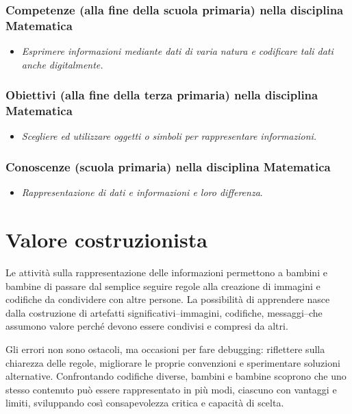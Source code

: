 \subsubsection{Competenze (alla fine della scuola primaria) nella disciplina Matematica}


\begin{itemize}
\item
  \emph{Esprimere informazioni mediante dati di varia natura e codificare tali dati anche digitalmente.}
\end{itemize}


\subsubsection{Obiettivi (alla fine della terza primaria) nella disciplina Matematica}


\begin{itemize}
\item
  \emph{Scegliere ed utilizzare oggetti o simboli per rappresentare informazioni.}
\end{itemize}

\subsubsection{Conoscenze (scuola primaria) nella disciplina Matematica}
\begin{itemize}
\item
  \emph{Rappresentazione di dati e informazioni e loro differenza}.
\end{itemize}

\section{Valore costruzionista }\label{valore-costruzionista-2}

Le attività sulla rappresentazione delle informazioni permettono a bambini e bambine di passare dal semplice seguire regole alla creazione di immagini e codifiche da condividere con altre persone. La possibilità di apprendere nasce dalla costruzione di artefatti significativi--immagini, codifiche, messaggi--che assumono valore perché devono essere condivisi e compresi da altri.

Gli errori non sono ostacoli, ma occasioni per fare debugging: riflettere sulla chiarezza delle regole, migliorare le proprie convenzioni e sperimentare soluzioni alternative. Confrontando codifiche diverse, bambini e bambine scoprono che uno stesso contenuto può essere rappresentato in più modi, ciascuno con vantaggi e limiti, sviluppando così consapevolezza critica e capacità di scelta.

